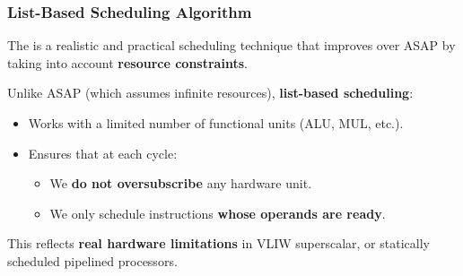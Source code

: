 \subsubsection{List-Based Scheduling Algorithm}

The  is a realistic and practical scheduling technique that improves over ASAP by taking into account \textbf{resource constraints}.

\highspace
Unlike ASAP (which assumes infinite resources), \textbf{list-based scheduling}:
\begin{itemize}
    \item Works with a limited number of functional units (ALU, MUL, etc.).
    \item Ensures that at each cycle:
    \begin{itemize}[label=\textcolor{Green3}{}]
        \item We \textbf{do not oversubscribe} any hardware unit.
        \item We only schedule instructions \textbf{whose operands are ready}.
    \end{itemize}
\end{itemize}
This reflects \textbf{real hardware limitations} in VLIW superscalar, or statically scheduled pipelined processors.

